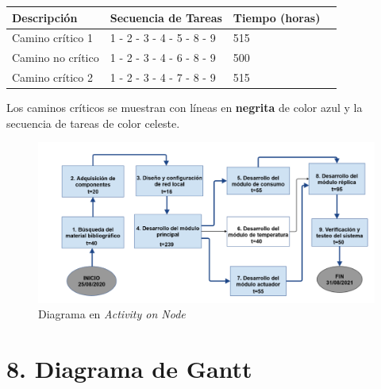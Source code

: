 \documentclass[11pt]{charter}
\begin{document}
\begin{table}[ht]
\begin{tabularx}{\linewidth}{@{}|l|X|X|l|@{}}
\hline
\rowcolor[HTML]{C0C0C0} 
Descripción        & Secuencia de Tareas    & Tiempo (horas) 	\\ \hline
Camino crítico 1   & 1 - 2 - 3 - 4 - 5 - 8 - 9 & 515	 \\ \hline
Camino no crítico  & 1 - 2 - 3 - 4 - 6 - 8 - 9 & 500	 \\ \hline
Camino crítico 2   & 1 - 2 - 3 - 4 - 7 - 8 - 9 & 515  \\ \hline
\end{tabularx}
\end{table}
Los caminos críticos se muestran con líneas en \textbf{negrita} de color azul y la secuencia de tareas de color celeste.




\begin{figure}[htpb]
\centering 
\includegraphics[width=1.0\textwidth]{./Figuras/AoN.png}
\caption{Diagrama en \textit{Activity on Node}}
\label{fig:AoN}
\end{figure}



\section{8. Diagrama de Gantt}
\label{sec:gantt}
\end{document}

